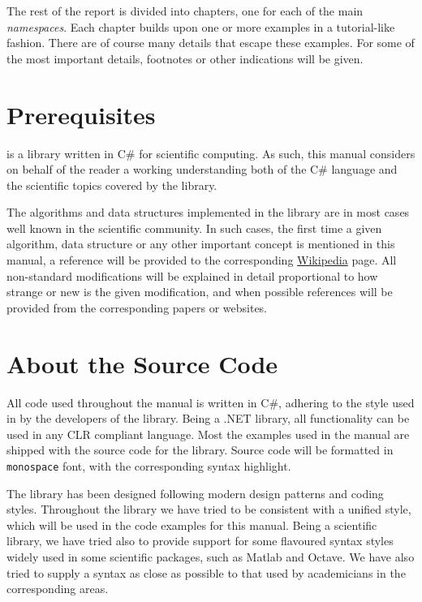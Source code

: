 The rest of the report is divided into chapters, one for each
of the \sct main \emph{namespaces}. Each chapter builds upon
one or more examples in a tutorial-like fashion. There are
of course many details that escape these examples. For some
of the most important details, footnotes or other indications will
be given.

\section*{Prerequisites}

\sct is a library written in C\# for scientific computing. As
such, this manual considers on behalf of the reader a working
understanding both of the C\# language and the scientific topics
covered by the library. 

The algorithms and data structures implemented in the library
are in most cases well known in the scientific community.
In such cases, the first time a given algorithm, data structure
or any other important concept is mentioned in this manual, a
reference will be provided to the corresponding 
\href{http://en.wikipedia.org}{Wikipedia} page. All non-standard
modifications will be explained in detail proportional to
how strange or new is the given modification, and when possible
references will be provided from the corresponding papers or
websites.

\section*{About the Source Code}

All code used throughout the manual is written in C\#, adhering
to the style used in by the developers of the library. Being a 
.NET library, all functionality can be used in any CLR compliant
language. Most the examples used in the manual are shipped
with the source code for the library. 
Source code will be formatted in \verb|monospace| font, with
the corresponding syntax highlight.

The \sct library has been designed following modern
design patterns and coding styles. Throughout the library we have
tried to be consistent with a unified style, which will be used in
the code examples for this manual. Being a scientific library, we
have tried also to provide support for some flavoured syntax styles
widely used in some scientific packages, such as Matlab and Octave.
We have also tried to supply a syntax as close as possible to that
used by academicians in the corresponding areas.

